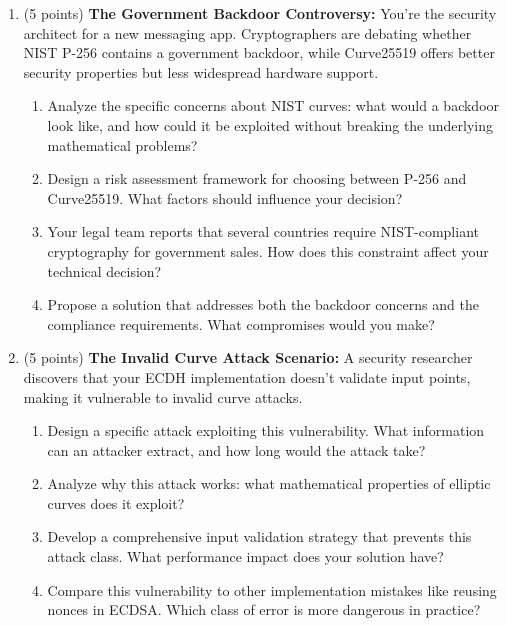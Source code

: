 \documentclass[10pt,a4paper,american]{article}
\begin{document}
\begin{enumerate}
	\item (5 points) \textbf{The Government Backdoor Controversy:}
	      You're the security architect for a new messaging app. Cryptographers are debating whether NIST P-256 contains a government backdoor, while Curve25519 offers better security properties but less widespread hardware support.
	      \begin{enumerate}
		      \item Analyze the specific concerns about NIST curves: what would a backdoor look like, and how could it be exploited without breaking the underlying mathematical problems?
		      \item Design a risk assessment framework for choosing between P-256 and Curve25519. What factors should influence your decision?
		      \item Your legal team reports that several countries require NIST-compliant cryptography for government sales. How does this constraint affect your technical decision?
		      \item Propose a solution that addresses both the backdoor concerns and the compliance requirements. What compromises would you make?
	      \end{enumerate}

	\item (5 points) \textbf{The Invalid Curve Attack Scenario:}
	      A security researcher discovers that your ECDH implementation doesn't validate input points, making it vulnerable to invalid curve attacks.
	      \begin{enumerate}
		      \item Design a specific attack exploiting this vulnerability. What information can an attacker extract, and how long would the attack take?
		      \item Analyze why this attack works: what mathematical properties of elliptic curves does it exploit?
		      \item Develop a comprehensive input validation strategy that prevents this attack class. What performance impact does your solution have?
		      \item Compare this vulnerability to other implementation mistakes like reusing nonces in ECDSA. Which class of error is more dangerous in practice?
	      \end{enumerate}


\end{enumerate}
\end{document}
